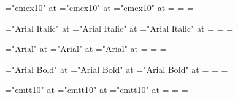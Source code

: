 \font\1="cmex10" at \largefont
\font\2="cmex10" at \normalfont
\font\3="cmex10" at \smallfont
{}=\1 =\2 =\3

\def\hugeit   {\font\zfontz="Arial Italic" at \hugefont   \zfontz}
\def\largeit  {\font\zfontz="Arial Italic" at \largefont  \zfontz}
\def\normalit {\font\zfontz="Arial Italic" at \normalfont \zfontz}
\def\smallit  {\font\zfontz="Arial Italic" at \smallfont  \zfontz}
\def\tinyit   {\font\zfontz="Arial Italic" at \tinyfont   \zfontz}

\font\1="Arial Italic" at \largefont
\font\2="Arial Italic" at \normalfont
\font\3="Arial Italic" at \smallfont
{}=\1 =\2 =\3
\def\it{\fam=4}

\def\hugesl   {\font\zfontz="Arial" at \hugefont   \zfontz}
\def\largesl  {\font\zfontz="Arial" at \largefont  \zfontz}
\def\normalsl {\font\zfontz="Arial" at \normalfont \zfontz}
\def\smallsl  {\font\zfontz="Arial" at \smallfont  \zfontz}
\def\tinysl   {\font\zfontz="Arial" at \tinyfont   \zfontz}

\font\1="Arial" at \largefont
\font\2="Arial" at \normalfont
\font\3="Arial" at \smallfont
{}=\1 =\2 =\3
\def\sl{\fam=5}

\def\hugebf   {\font\zfontz="Arial Bold" at \hugefont   \zfontz}
\def\largebf  {\font\zfontz="Arial Bold" at \largefont  \zfontz}
\def\normalbf {\font\zfontz="Arial Bold" at \normalfont \zfontz}
\def\smallbf  {\font\zfontz="Arial Bold" at \smallfont  \zfontz}
\def\tinybf   {\font\zfontz="Arial Bold" at \tinyfont   \zfontz}

\font\1="Arial Bold" at \largefont
\font\2="Arial Bold" at \normalfont
\font\3="Arial Bold" at \smallfont
{}=\1 =\2 =\3
\def\bf{\fam=6}

\def\hugett   {\font\zfontz="cmtt10" at \hugefont   \zfontz}
\def\largett  {\font\zfontz="cmtt10" at \largefont  \zfontz}
\def\normaltt {\font\zfontz="cmtt10" at \normalfont \zfontz}
\def\smalltt  {\font\zfontz="cmtt10" at \smallfont  \zfontz}
\def\tinytt   {\font\zfontz="cmtt10" at \tinyfont   \zfontz}

\font\1="cmtt10" at \largefont
\font\2="cmtt10" at \normalfont
\font\3="cmtt10" at \smallfont
{}=\1 =\2 =\3
\def\tt{\fam=7}

\def\hugebfit   {\font\zfontz="Arial Bold Italic" at \hugefont   \zfontz}
\def\largebfit  {\font\zfontz="Arial Bold Italic" at \largefont  \zfontz}
\def\normalbfit {\font\zfontz="Arial Bold Italic" at \normalfont \zfontz}
\def\smallbfit  {\font\zfontz="Arial Bold Italic" at \smallfont  \zfontz}
\def\tinybfit   {\font\zfontz="Arial Bold Italic" at \tinyfont   \zfontz}
